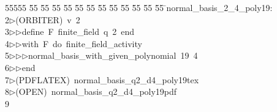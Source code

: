 %
%
\begin{tabbing}
55555 \= 55 \= 55 \= 55 \= 55 \= 55 \= 55 \= 55 \= 55 \= 55 \= 55 \= 55 \= 55 \= \>normal\_basis\_2\_4\_poly19:\\[0pt]
2\>$\triangleright$\>(ORBITER)\ v\ 2\ \\[0pt]
3\>$\triangleright$\>$\triangleright$\>define\ F\ finite\_field\ q\ 2\ end\ \\[0pt]
4\>$\triangleright$\>$\triangleright$\>with\ F\ do\ finite\_field\_activity\ \\[0pt]
5\>$\triangleright$\>$\triangleright$\>$\triangleright$\>normal\_basis\_with\_given\_polynomial\ 19\ 4\ \\[0pt]
6\>$\triangleright$\>$\triangleright$\>end\\[0pt]
7\>$\triangleright$\>(PDFLATEX)\ normal\_basis\_q2\_d4\_poly19tex\\[0pt]
8\>$\triangleright$\>(OPEN)\ normal\_basis\_q2\_d4\_poly19pdf\\[0pt]
9\>\end{tabbing}
